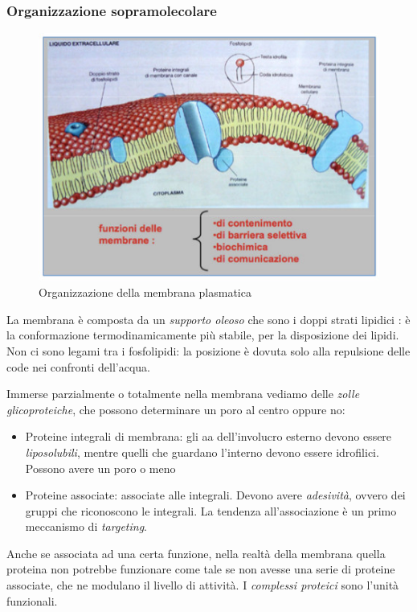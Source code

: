 \documentclass[a4paper,12pt]{article}
\begin{document}
\subsubsection{Organizzazione sopramolecolare}
\begin{figure}[H]
\centering
\includegraphics[scale=0.4]{immagine/sopramolecolare.jpg}
\caption{Organizzazione della membrana plasmatica}
\end{figure}

La membrana è composta da un \emph{supporto oleoso} che sono i doppi strati lipidici : è la conformazione termodinamicamente più stabile, per la disposizione dei lipidi. Non ci sono legami tra i fosfolipidi: la posizione è dovuta solo alla repulsione delle code nei confronti dell'acqua.

Immerse parzialmente o totalmente nella membrana vediamo delle \emph{zolle glicoproteiche}, che possono determinare un poro al centro oppure no:
\begin{itemize}
\item{Proteine integrali di membrana: gli aa dell'involucro esterno devono essere \emph{liposolubili}, mentre quelli che guardano l'interno devono essere idrofilici. Possono avere un poro o meno}
\item{Proteine associate: associate alle integrali. Devono avere \emph{adesività}, ovvero dei gruppi che riconoscono le integrali. La tendenza all'associazione è un primo meccanismo di \emph{targeting}.}
\end{itemize}

Anche se associata ad una certa funzione, nella realtà della membrana quella proteina non potrebbe funzionare come tale se non avesse una serie di proteine associate, che ne modulano il livello di attività. I \emph{complessi proteici} sono l'unità funzionali.
\end{document}
